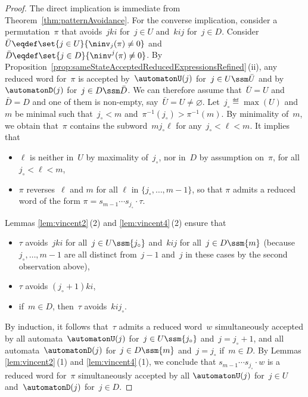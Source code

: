 \begin{proof}
The direct implication is immediate from Theorem~\ref{thm:patternAvoidance}.
For the converse implication, consider a permutation~$\pi$ that avoids~$jki$ for~$j \in U$ and~$kij$ for~$j \in D$.
Consider $\bar U \eqdef \set{j \in U}{\ninv_j(\pi) \ne 0}$ and~$\bar D \eqdef \set{j \in D}{\ninv^j(\pi) \ne 0}$.
By Proposition~\ref{prop:sameStateAcceptedReducedExpressionsRefined}\,(ii), any reduced word for~$\pi$ is accepted by~$\automatonU(j)$ for~$j \in U \ssm \bar U$ and by~$\automatonD(j)$ for~$j \in D \ssm \bar D$.
We can therefore assume that~$\bar U = U$ and~$\bar D = D$ and one of them is non-empty, say~$\bar U = U \ne \varnothing$.
Let~$j_\circ \eqdef \max(U)$ and~$m$ be minimal such that~$j_\circ < m$ and~$\pi^{-1}(j_\circ) > \pi^{-1}(m)$.
By minimality of~$m$, we obtain that~$\pi$ contains the subword~$mj_\circ\ell$ for any~$j_\circ < \ell < m$.
It implies that
\begin{itemize}
\item $\ell$ is neither in~$U$ by maximality of~$j_\circ$, nor in~$D$ by assumption on~$\pi$, for all~$j_\circ < \ell < m$,
\item $\pi$ reverses~$\ell$ and $m$ for all $\ell$ in $\{j_\circ,\dots,m-1\}$, so that $\pi$ admits a reduced word of the form $\pi = s_{m-1} \cdots s_{j_\circ} \cdot \tau$.
\end{itemize}
Lemmas \ref{lem:vincent2}\,(2) and \ref{lem:vincent4}\,(2) ensure that
\begin{itemize}
\item $\tau$ avoids~$jki$ for all~$j \in U \ssm \{j_\circ\}$ and~$kij$ for all~$j \in D \ssm \{m\}$ (because~$j_\circ, \dots, m-1$ are all distinct from~$j-1$ and~$j$ in these cases by the second observation above),
\item $\tau$ avoids $(j_\circ+1)ki$,
\item if~$m \in D$, then~$\tau$ avoids~$kij_\circ$.
\end{itemize}
By induction, it follows that~$\tau$ admits a reduced word~$w$ simultaneously accepted by all automata~$\automatonU(j)$ for~$j \in U \ssm \{j_\circ\}$ and~$j = j_\circ + 1$, and all automata~$\automatonD(j)$ for~$j \in D \ssm \{m\}$ and~$j = j_\circ$ if~$m \in D$.
By Lemmas \ref{lem:vincent2}\,(1) and \ref{lem:vincent4}\,(1), we conclude that $s_{m-1} \cdots s_{j_\circ} \cdot w$ is a reduced word for~$\pi$ simultaneously accepted by all $\automatonU(j)$ for~$j \in U$ and~$\automatonD(j)$ for~$j \in D$.
\end{proof}

